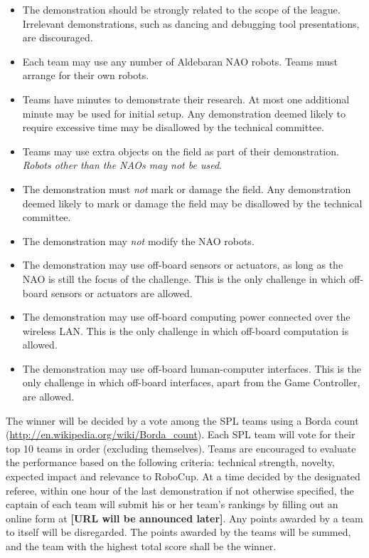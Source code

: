 \documentclass[12pt]{article}
\begin{document}
\begin{itemize}
\item 
The demonstration should be strongly related to the scope of the league. 
Irrelevant demonstrations, such as dancing and debugging tool presentations, 
are discouraged.
\item 
Each team may use any number of Aldebaran NAO robots. Teams must arrange
for their own robots.
\item 
Teams have \openMinNum{} minutes to demonstrate their research. At most one 
additional minute may be used for initial setup. Any demonstration deemed
likely to require excessive time may be disallowed by the technical
committee.
\item 
Teams may use extra objects on the field as part of their
demonstration. \emph{Robots other than the NAOs may not be used}.
\item 
The demonstration must \emph{not} mark or damage the field. Any
demonstration deemed likely to mark or damage the field may be
disallowed by the technical committee.
\item
The demonstration may \emph{not} modify the NAO robots.
\item 
The demonstration may use off-board sensors or actuators, as long 
as the NAO is still the focus of the challenge.  This is the only 
challenge in which off-board sensors or actuators are allowed.
\item 
The demonstration may use off-board computing power connected over the
wireless LAN. This is the only challenge in which off-board
computation is allowed.
\item 
The demonstration may use off-board human-computer interfaces. This
is the only challenge in which off-board interfaces, apart from the
Game Controller, are allowed.
\end{itemize}

The winner will be decided by a vote among the SPL teams using a Borda
count (\url{http://en.wikipedia.org/wiki/Borda_count}). Each SPL 
team will vote for their top 10 teams in order (excluding themselves).
Teams are encouraged to evaluate the performance based on the
following criteria: technical strength, novelty, expected impact and
relevance to RoboCup. At a time decided by the designated referee,
within one hour of the last demonstration if not otherwise
specified, the captain of each team will submit his or her team's rankings 
by filling out an online form at \textbf{[URL will be announced later]}.  Any points 
awarded by a team to itself will be disregarded. The points awarded by the 
teams will be summed, and the team with the highest total score shall be the winner.
\end{document}
